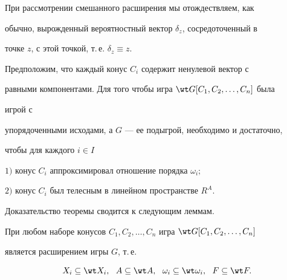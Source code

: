  


\begin{notenonum} 


При рассмотрении смешанного расширения мы отождествляем, как 


обычно, вырожденный вероятностный вектор $\delta_z$, сосредоточенный в 


точке $z$, с этой точкой, т.\,е. $\delta_z\equiv z$. 


\end{notenonum} 


 


\begin{thms} 


Предположим, что каждый конус $C_i$ содержит ненулевой вектор с 


равными компонентами. Для того чтобы игра $\wt G[C_1,C_2,\dotsc,C_n]$ была 


игрой с 


упорядоченными исходами, а $G$ --- ее подыгрой, необходимо и достаточно, 


чтобы для каждого $i\in I$ 


 


$1)$ конус $C_i$ аппроксимировал отношение порядка $\omega_i;$ 


 


$2)$ конус $C_i$ был телесным в линейном пространстве $R^A$. 


\end{thms} 


 


Доказательство теоремы сводится к следующим леммам. 


 


\begin{lems} 


При любом наборе конусов $C_1,C_2,\dotsc,C_n$ игра $\wt 


G[C_1,C_2,\dotsc,C_n]$ 


является расширением игры $G$, т.\,е. 


$$ 


X_i\subseteq\wt X_i,\ \ A\subseteq\wt A, 


\ \ \omega_i\subseteq\wt\omega_i,\ \ F\subseteq\wt F. 


$$ 


\end{lems} 


